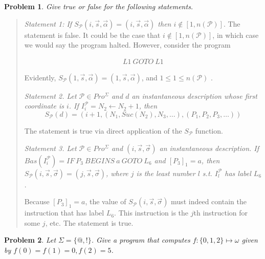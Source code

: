 \documentclass[a4paper, 12pt]{article}
\newtheorem{problem}{Problem}
\newtheorem{problem}{Problem}
\begin{document}
\begin{problem}
    Give true or false for the following statements.
\end{problem}


\small
\begin{quote}


\textit{Statement 1: If $S_{\mathcal{P}}(i, \overrightarrow{s},
\overrightarrow{\alpha}) = (i, \overrightarrow{s}, \overrightarrow{\alpha})$
then $i \not\in [1, n(\mathcal{P})]$}. The statement is false. It could be the
case that $i \not\in [1, n( \mathcal{P} )]$, in which case we would say the program
halted. However, consider the program 

\begin{align*}
    L1 ~ GOTO ~ L1 
\end{align*}

Evidently, $S_{\mathcal{P}}(1, \overrightarrow{s}, \overrightarrow{\alpha}) =
(1, \overrightarrow{s}, \overrightarrow{\alpha})$, and $1 \leq 1 \leq
n(\mathcal{P})$ .

\textit{Statement 2. Let $\mathcal{P} \in Pro^{\Sigma}$ and $d$ an instantaneous
description whose first coordinate is $i$. If $I_i^{\mathcal{P}} = N_2
\leftarrow N_2 + 1$, then $$S_{\mathcal{P}}(d) = \left( i+1, \left( N_1,
Suc(N_2), N_3, \ldots \right), (P_1, P_2, P_3, \ldots)  \right) $$}

The statement is true via direct application of the $S_{\mathcal{P}}$ function.

\textit{Statement 3. Let $\mathcal{P} \in Pro^{\Sigma}$ and $(i,
\overrightarrow{s}, \overrightarrow{\sigma})$ an instantaneous description. If
$Bas(I_i^{\mathcal{P}}) = IF ~ P_3 ~ BEGINS ~ a ~ GOTO ~ L_6$ and $[P_3]_1 = a$,
then $S_{\mathcal{P}}(i, \overrightarrow{s}, \overrightarrow{\sigma}) = (j,
\overrightarrow{s}, \overrightarrow{\sigma})$, where $j$ is the least number $l$
s.t. $I_{l}^{\mathcal{P}}$ has label $L_6$}.

Because $[P_3]_1 = a$, the value of $S_{\mathcal{P}}(i, \overrightarrow{s},
\overrightarrow{\sigma})$ must indeed contain the instruction that has label
$L_6$. This instruction is the $j$th instruction for some $j$, etc. The
statement is true.


\end{quote}
\normalsize

\begin{problem}
    Let $\Sigma = \{@, !\}$. Give a program that computes $f : \{0, 1, 2\}
    \mapsto \omega $ given by $f(0) = f(1) = 0, f(2) = 5$.
\end{problem}
\end{document}
